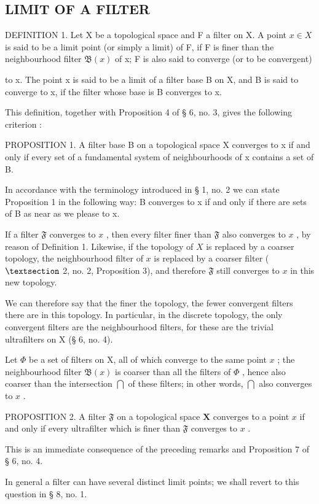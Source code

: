 \subsection{LIMIT OF A FILTER}

DEFINITION 1. Let X be a topological space and F a filter on X. A point \(x \in X\) is said to be a limit point (or simply a limit) of F, if F is finer than the neighbourhood filter \(\mathfrak{B}(x)\) of x; F is also said to converge (or to be convergent)

to x. The point x is said to be a limit of a filter base B on X, and B is said to converge to x, if the filter whose base is B converges to x.

This definition, together with Proposition 4 of § 6, no. 3, gives the following criterion :

PROPOSITION 1. A filter base B on a topological space X converges to x if and only if every set of a fundamental system of neighbourhoods of x contains a set of B.

In accordance with the terminology introduced in § 1, no. 2 we can state Proposition 1 in the following way: B converges to x if and only if there are sets of B as near as we please to x.

If a filter \(\mathfrak{F}\) converges to \(x\) , then every filter finer than \(\mathfrak{F}\) also converges to \(x\) , by reason of Definition 1. Likewise, if the topology of \(X\) is replaced by a coarser topology, the neighbourhood filter of \(x\) is replaced by a coarser filter ( \(\S\) 2, no. 2, Proposition 3), and therefore \(\mathfrak{F}\) still converges to \(x\) in this new topology.

We can therefore say that the finer the topology, the fewer convergent filters there are in this topology. In particular, in the discrete topology, the only convergent filters are the neighbourhood filters, for these are the trivial ultrafilters on X (§ 6, no. 4).

Let \(\Phi\) be a set of filters on X, all of which converge to the same point \(x\) ; the neighbourhood filter \(\mathfrak{B}(x)\) is coarser than all the filters of \(\Phi\) , hence also coarser than the intersection \(\bigcap\) of these filters; in other words, \(\bigcap\) also converges to \(x\) .

PROPOSITION 2. A filter \(\mathfrak{F}\) on a topological space \(\mathbf{X}\) converges to a point \(x\) if and only if every ultrafilter which is finer than \(\mathfrak{F}\) converges to \(x\) .

This is an immediate consequence of the preceding remarks and Proposition 7 of § 6, no. 4.

In general a filter can have several distinct limit points; we shall revert to this question in § 8, no. 1.

